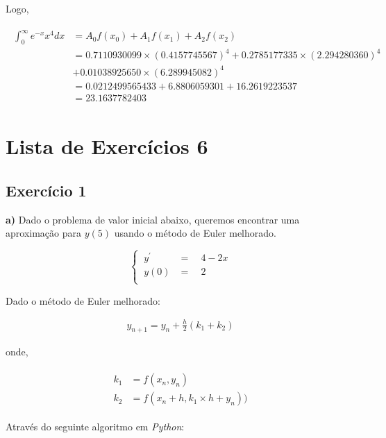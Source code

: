 \documentclass[paper=a4, fontsize=12pt]{scrartcl}
\numberwithin{equation}{section} %
\numberwithin{figure}{section} %
\numberwithin{table}{section} %
\newcommand{\euler}{e}
\begin{document}
		Logo,

		\begin{align*}
		\begin{split}
			\int_{0}^{\infty} \euler^{-x}x^{4} dx &= A_0f(x_0) + A_1f(x_1) + A_2f(x_2) \\&=  0.7110930099 \times (0.4157745567)^4 + 0.2785177335 \times (2.294280360)^4 \\&+ 0.01038925650	 \times (6.289945082)^4 \\
			&= 0.0212499565433 + 6.8806059301 + 16.2619223537 \\
			&= 23.1637782403
		\end{split}
		\end{align*}

		\section*{Lista de Exercícios 6}

		\subsection{Exercício 1}

		\textbf{a)} Dado o problema de valor inicial abaixo, queremos encontrar uma aproximação para $y(5)$ usando o método de Euler melhorado.

		\[
		\begin{cases}
		\ y^{'} &= \quad 4 - 2x\\

		\ y(0) &= \quad 2\\
		\end{cases}
		\]

		Dado o método de Euler melhorado:

		\begin{align*}
				y_{n + 1} = y_n + \frac{h}{2}(k_1 + k_2)
		\end{align*}

		onde,

		\begin{align*}
			\begin{split}
				k_1 &= f(x_n, y_n) \\
				k_2 &= f(x_n + h, k_1\times h + y_n))
			\end{split}
		\end{align*}

		Através do seguinte algoritmo em \textit{Python}:

		\hspace{2cm}
\end{document}
